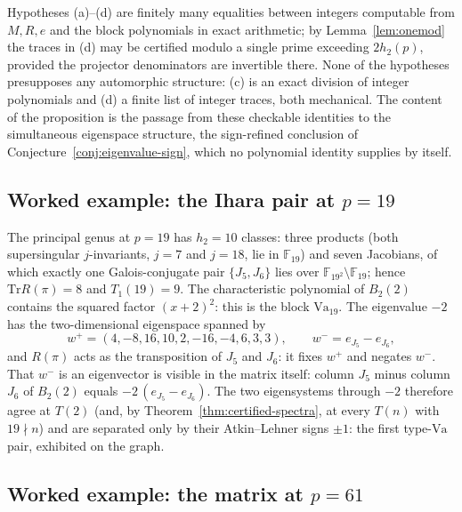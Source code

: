 \documentclass[10pt,a4paper]{amsart}
\newcommand{\F}{\mathbb{F}}
\newcommand{\Tr}{\mathrm{Tr}}
\newcommand{\Va}{\mathrm{Va}}
\providecommand{\Va}{\mathrm{Va}}
\begin{document}
	Hypotheses \textup{(a)}--\textup{(d)} are finitely many equalities between
	integers computable from $M,R,e$ and the block polynomials in exact
	arithmetic; by Lemma~\ref{lem:onemod} the traces in \textup{(d)} may be
	certified modulo a single prime exceeding $2h_2(p)$, provided the
	projector denominators are invertible there. None of the hypotheses
	presupposes any automorphic structure: \textup{(c)} is an exact division
	of integer polynomials and \textup{(d)} a finite list of integer traces,
	both mechanical. The content of the proposition is the passage from these
	checkable identities to the simultaneous eigenspace structure, the
	sign-refined conclusion of Conjecture~\ref{conj:eigenvalue-sign}, which
	no polynomial identity supplies by itself.
	
	\subsection{Worked example: the Ihara pair at $p=19$}
	\label{ss:ihara19}
	
	The principal genus at $p=19$ has $h_2=10$ classes: three products
	(both supersingular $j$-invariants, $j=7$ and $j=18$, lie in $\F_{19}$)
	and seven Jacobians, of which exactly one Galois-conjugate pair
	$\{J_5,J_6\}$ lies over $\F_{19^2}\setminus\F_{19}$; hence $\Tr R(\pi)=8$
	and $T_1(19)=9$. The characteristic polynomial of $B_2(2)$ contains the
	squared factor $(x+2)^2$: this is the block $\Va_{19}$. The eigenvalue
	$-2$ has the two-dimensional eigenspace spanned by
	\[
	w^+=(4,-8,16,10,2,-16,-4,6,3,3),\qquad
	w^-=e_{J_5}-e_{J_6},
	\]
	and $R(\pi)$ acts as the transposition of $J_5$ and $J_6$: it fixes $w^+$
	and negates $w^-$. That $w^-$ is an eigenvector is visible in the matrix
	itself: column $J_5$ minus column $J_6$ of $B_2(2)$ equals
	$-2\,(e_{J_5}-e_{J_6})$. The two eigensystems through $-2$ therefore agree
	at $T(2)$ (and, by Theorem~\ref{thm:certified-spectra}, at every $T(n)$
	with $19\nmid n$) and are separated only by their Atkin--Lehner signs
	$\pm1$: the first type-$\Va$ pair, exhibited on the graph.
	
	\subsection{Worked example: the matrix at $p=61$}
	\label{ss:p61}
	
\end{document}
